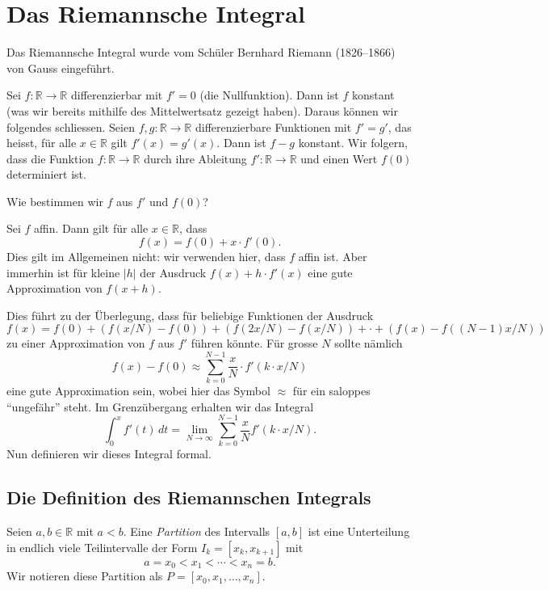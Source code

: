 \documentclass[../main.tex]{subfiles}
\begin{document}
\chapter{Das Riemannsche Integral}
Das Riemannsche Integral wurde
vom Schüler Bernhard Riemann (1826--1866)
von Gauss eingeführt.

Sei $f \colon \mathbb{R} \to \mathbb{R}$ differenzierbar
mit $f' = 0$ (die Nullfunktion).
Dann ist $f$ konstant (was wir bereits mithilfe des
Mittelwertsatz gezeigt haben). Daraus können wir
folgendes schliessen.
Seien $f, g \colon \mathbb{R} \to \mathbb{R}$ 
differenzierbare
Funktionen mit
$f' = g'$, das heisst, für alle $x \in \mathbb{R}$
gilt $f'(x) = g'(x)$.
Dann ist $f - g$ konstant.
Wir folgern, dass die Funktion $f \colon \mathbb{R} \to \mathbb{R}$ 
durch ihre Ableitung $f' \colon \mathbb{R} \to \mathbb{R}$ 
und einen Wert $f(0)$ determiniert ist.

\begin{question}
  Wie bestimmen wir $f$ aus $f'$ 
  und $f(0)$?
\end{question}

\begin{specialcase}
  Sei $f$ affin. Dann gilt für alle
  $x \in \mathbb{R}$, dass
  \[
    f(x) = f(0) + x \cdot f'(0).
  \]
  Dies gilt im Allgemeinen nicht: wir verwenden
  hier, dass $f$ affin ist.
  Aber immerhin ist für kleine $|h|$
  der Ausdruck $f(x) + h \cdot f'(x)$ eine
  gute Approximation von $f(x + h)$.
\end{specialcase}

Dies führt zu der Überlegung, dass für beliebige
Funktionen der Ausdruck
\[
  f(x) = f(0) + (f(x/N) - f(0))
  + (f(2x/N) - f(x/N)) + \cdot
  + (f(x) - f((N-1)x/N))
\]
zu einer Approximation von $f$ aus
$f'$ führen könnte. Für grosse $N$ 
sollte nämlich
\[
  f(x) - f(0) \approx \sum_{k = 0}^{N - 1} 
  \frac{x}{N} \cdot f'(k \cdot x / N)
\]
eine gute Approximation sein, wobei
hier das Symbol $\approx$ für ein
saloppes ``ungefähr'' steht.
Im Grenzübergang erhalten wir das
Integral
\[
  \int_{0}^{x} f'(t) \, dt =
  \lim_{N \to \infty} \sum_{k = 0}^{N - 1} \frac{x}{N}
  f'(k \cdot x/N).
\]
Nun definieren wir dieses Integral formal.

\section{Die Definition des Riemannschen Integrals}\label{sec:riemann-definition}
\begin{definition}
  Seien $a,b \in \mathbb{R}$
  mit $a < b$. Eine \emph{Partition} des Intervalls
  $[a, b]$ ist eine Unterteilung in
  endlich viele Teilintervalle der
  Form
  $I_k = [x_k, x_{k  + 1}]$ mit
  \[
    a = x_0 < x_1 < \cdots < x_n = b.
  \]
  Wir notieren diese Partition als
  $P = [x_0, x_1, \dots, x_n]$.
\end{definition}
\end{document}
